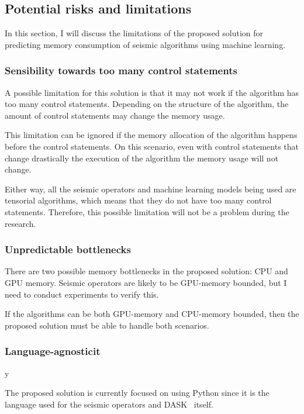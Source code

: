 \subsection{Potential risks and limitations}
\label{subsec:potential-risks-and-limitations}

In this section, I will discuss the limitations of the proposed solution for predicting memory consumption of seismic algorithms using machine learning.

\subsubsection{Sensibility towards too many control statements}

A possible limitation for this solution is that it may not work if the algorithm has too many control statements.
Depending on the structure of the algorithm, the amount of control statements may change the memory usage.

This limitation can be ignored if the memory allocation of the algorithm happens before the control statements.
On this scenario, even with control statements that change drastically the execution of the algorithm the memory usage will not change.

Either way, all the seismic operators and machine learning models being used are tensorial algorithms, which means that they do not have too many control statements.
Therefore, this possible limitation will not be a problem during the research.

\subsubsection{Unpredictable bottlenecks}

There are two possible memory bottlenecks in the proposed solution: CPU and GPU memory.
Seismic operators are likely to be GPU-memory bounded, but I need to conduct experiments to verify this.

If the algorithms can be both GPU-memory and CPU-memory bounded, then the proposed solution must be able to handle both scenarios.

\subsubsection{Language-agnosticit} y

The proposed solution is currently focused on using Python since it is the language used for the seismic operators and DASK~\cite{dask} itself.

